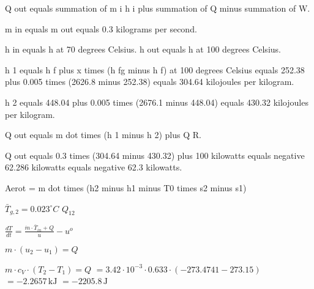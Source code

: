 Q out equals summation of m i h i plus summation of Q minus summation of W.  

m in equals m out equals 0.3 kilograms per second.  

h in equals h at 70 degrees Celsius.  
h out equals h at 100 degrees Celsius.  

h 1 equals h f plus x times (h fg minus h f) at 100 degrees Celsius equals 252.38 plus 0.005 times (2626.8 minus 252.38) equals 304.64 kilojoules per kilogram.  

h 2 equals 448.04 plus 0.005 times (2676.1 minus 448.04) equals 430.32 kilojoules per kilogram.  

Q out equals m dot times (h 1 minus h 2) plus Q R.  

Q out equals 0.3 times (304.64 minus 430.32) plus 100 kilowatts equals negative 62.286 kilowatts equals negative 62.3 kilowatts.

Aerot = m dot times (h2 minus h1 minus T0 times s2 minus s1)

\( \bar{T}_{g,2} = 0.023^\circ C \)  
\( Q_{12} \)  

\( \frac{dT}{dt} = \frac{\dot{m} \cdot \bar{T}_{in} + Q}{u} - u^o \)  

\( m \cdot (u_2 - u_1) = Q \)  

\( m \cdot c_V \cdot (T_2 - T_1) = Q \)  
\( = 3.42 \cdot 10^{-3} \cdot 0.633 \cdot (-273.4741 - 273.15) \)  
\( = -2.2657 \, \text{kJ} \)  
\( = -2205.8 \, \text{J} \)